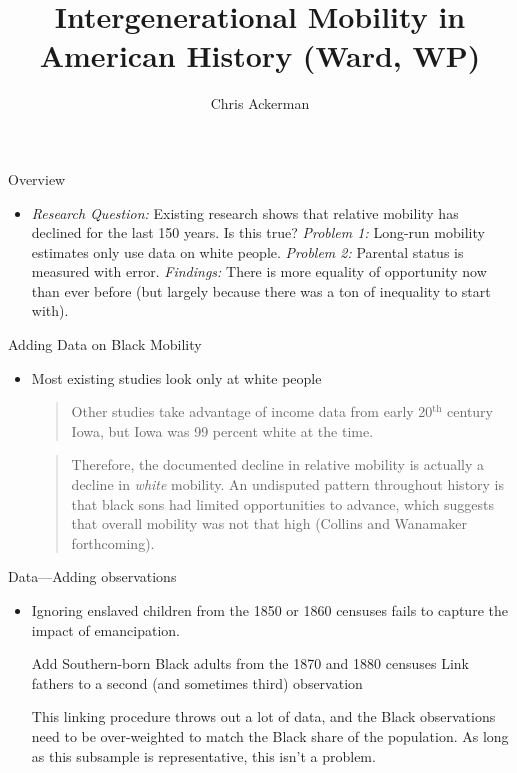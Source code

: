 \documentclass[dvipsnames]{beamer}
\title{Intergenerational Mobility in American History (Ward, WP)}
\author{Chris Ackerman}
\begin{document}
\maketitle
\begin{frame}{Overview}
  \begin{itemize}
  \item \emph{Research Question:} Existing research shows that relative mobility has declined for the last 150 years. Is this true?
  \vitem \emph{Problem 1:} Long-run mobility estimates only use data on white people.
  \vitem \emph{Problem 2:} Parental status is measured with error.
  \vitem \emph{Findings:} There is more equality of opportunity now than ever before (but largely because there was a ton of inequality to start with).
  \end{itemize}
\end{frame}
%
\begin{frame}{Adding Data on Black Mobility}
  \begin{itemize}
  \item Most existing studies look only at white people
    \vfill
    \begin{quote}
      Other studies take advantage of income data from early 20$^\text{th}$ century Iowa, but Iowa was 99 percent white at the time.
    \end{quote}
    \vfill
    \begin{quote}
      Therefore, the documented decline in relative mobility is actually a decline in \emph{white} mobility. An undisputed pattern throughout history is that black sons had limited opportunities to advance, which suggests that overall mobility was not that high (Collins and Wanamaker forthcoming).
    \end{quote}
  \end{itemize}
\end{frame}
%
\begin{frame}{Data---Adding observations}
  \begin{itemize}
  \item Ignoring enslaved children from the 1850 or 1860 censuses fails to capture the impact of emancipation.
    \begin{enumerate}
    \vitem Add Southern-born Black adults from the 1870 and 1880 censuses
      \vitem Link fathers to a second (and sometimes third) observation
    \end{enumerate}
    \vitem This linking procedure throws out a lot of data, and the Black observations need to be over-weighted to match the Black share of the population.
    \vitem As long as this subsample is representative, this isn't a problem.
  \end{itemize}
\end{frame}
\end{document}
